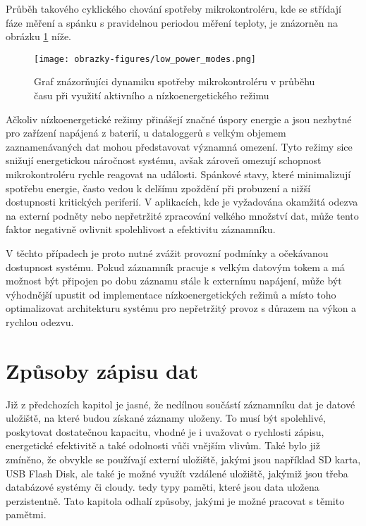 Průběh takového cyklického chování spotřeby mikrokontroléru, kde se střídají fáze měření a spánku s pravidelnou periodou měření 
teploty, je znázorněn na obrázku \ref{fig:low-power-modes} níže.

\begin{figure}[h]
    \centering
    \texttt{[image: obrazky-figures/low\_power\_modes.png]}
    
    \caption{Graf znázorňujíci dynamiku spotřeby mikrokontroléru v průběhu času při využití aktivního a nízkoenergetického režimu}
    \label{fig:low-power-modes}
\end{figure}

Ačkoliv nízkoenergetické režimy přinášejí značné úspory energie a jsou nezbytné pro zařízení napájená z baterií, u dataloggerů s 
velkým objemem zaznamenávaných dat mohou představovat významná omezení. Tyto režimy sice snižují energetickou náročnost systému, 
avšak zároveň omezují schopnost mikrokontroléru rychle reagovat na události. Spánkové stavy, které minimalizují spotřebu energie, 
často vedou k delšímu zpoždění při probuzení a nižší dostupnosti kritických periferií. V aplikacích, kde je vyžadována okamžitá 
odezva na externí podněty nebo nepřetržité zpracování velkého množství dat, může tento faktor negativně ovlivnit spolehlivost a 
efektivitu záznamníku. \cite{embedded_low_power_modes}

V těchto případech je proto nutné zvážit provozní podmínky a očekávanou dostupnost systému. Pokud záznamník pracuje s velkým 
datovým tokem a má možnost být připojen po dobu záznamu stále k externímu napájení, může být výhodnější upustit od implementace 
nízkoenergetických režimů a místo toho optimalizovat architekturu systému pro nepřetržitý provoz s důrazem na výkon a rychlou 
odezvu. \cite{analog_devices_low_power_modes}

\section{Způsoby zápisu dat}
Již z předchozích kapitol je jasné, že nedílnou součástí záznamníku dat je datové uložiště, na které budou získané záznamy uloženy. 
To musí být spolehlivé, poskytovat dostatečnou kapacitu, vhodné je i uvažovat o rychlosti zápisu, energetické efektivitě a také 
odolnosti vůči vnějším vlivům. Také bylo již zmíněno, že obvykle se používají externí uložiště, jakými jsou například SD karta, 
USB Flash Disk, ale také je možné využít vzdálené uložiště, jakýmiž jsou třeba databázové systémy či cloudy. tedy typy paměti, 
které jsou data uložena perzistentně. Tato kapitola odhalí způsoby, jakými je možné pracovat s těmito pamětmi.

